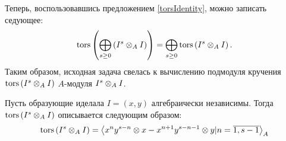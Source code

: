     Теперь, воспользовавшись предложением \ref{torsIdentity}, можно записать седующее:
    \begin{equation*}
        \textup{tors}\left(\bigoplus_{s \geq 0} \left( I^s \otimes_A I \right)\right) = 
        \bigoplus_{s \geq 0}\textup{tors}\left( I^s \otimes_A I \right).
    \end{equation*}
    Таким образом, исходная задача свелась к вычислению подмодуля кручения $\textup{tors}\left( I^s \otimes_A I \right)$ 
    $A$-модуля $I^s \otimes_A I$.
    \begin{Theorem}
        Пусть образующие иделала $I = (x, y)$ алгебраически независимы. 
        Тогда $\textup{tors}\left(I^s \otimes_A I\right)$ описывается следующим образом:
        \begin{equation*}
            \textup{tors}\left(I^s \otimes_A I\right) = \left< x^ny^{s - n} \otimes x - x^{n + 1}y^{s - n - 1} \otimes y |
             n = \overline{1, s-1}\right>_A
        \end{equation*}
    \end{Theorem}
